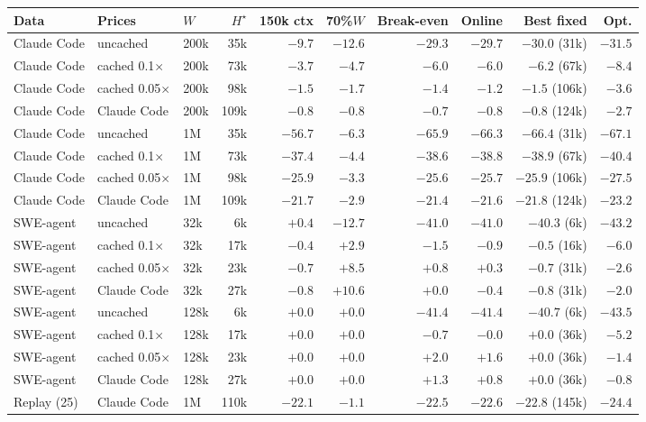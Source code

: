 \begin{tabular}{lllrrrrrrr}
\toprule
Data & Prices & $W$ & $H^\star$ & 150k ctx & 70\%$W$ & Break-even & Online & Best fixed & Opt.\\
\midrule
Claude Code & uncached & 200k & 35k & $-9.7$ & $-12.6$ & $-29.3$ & $-29.7$ & $-30.0$ (31k) & $-31.5$\\
Claude Code & cached 0.1$\times$ & 200k & 73k & $-3.7$ & $-4.7$ & $-6.0$ & $-6.0$ & $-6.2$ (67k) & $-8.4$\\
Claude Code & cached 0.05$\times$ & 200k & 98k & $-1.5$ & $-1.7$ & $-1.4$ & $-1.2$ & $-1.5$ (106k) & $-3.6$\\
Claude Code & Claude Code & 200k & 109k & $-0.8$ & $-0.8$ & $-0.7$ & $-0.8$ & $-0.8$ (124k) & $-2.7$\\
Claude Code & uncached & 1M & 35k & $-56.7$ & $-6.3$ & $-65.9$ & $-66.3$ & $-66.4$ (31k) & $-67.1$\\
Claude Code & cached 0.1$\times$ & 1M & 73k & $-37.4$ & $-4.4$ & $-38.6$ & $-38.8$ & $-38.9$ (67k) & $-40.4$\\
Claude Code & cached 0.05$\times$ & 1M & 98k & $-25.9$ & $-3.3$ & $-25.6$ & $-25.7$ & $-25.9$ (106k) & $-27.5$\\
Claude Code & Claude Code & 1M & 109k & $-21.7$ & $-2.9$ & $-21.4$ & $-21.6$ & $-21.8$ (124k) & $-23.2$\\
SWE-agent & uncached & 32k & 6k & $+0.4$ & $-12.7$ & $-41.0$ & $-41.0$ & $-40.3$ (6k) & $-43.2$\\
SWE-agent & cached 0.1$\times$ & 32k & 17k & $-0.4$ & $+2.9$ & $-1.5$ & $-0.9$ & $-0.5$ (16k) & $-6.0$\\
SWE-agent & cached 0.05$\times$ & 32k & 23k & $-0.7$ & $+8.5$ & $+0.8$ & $+0.3$ & $-0.7$ (31k) & $-2.6$\\
SWE-agent & Claude Code & 32k & 27k & $-0.8$ & $+10.6$ & $+0.0$ & $-0.4$ & $-0.8$ (31k) & $-2.0$\\
SWE-agent & uncached & 128k & 6k & $+0.0$ & $+0.0$ & $-41.4$ & $-41.4$ & $-40.7$ (6k) & $-43.5$\\
SWE-agent & cached 0.1$\times$ & 128k & 17k & $+0.0$ & $+0.0$ & $-0.7$ & $-0.0$ & $+0.0$ (36k) & $-5.2$\\
SWE-agent & cached 0.05$\times$ & 128k & 23k & $+0.0$ & $+0.0$ & $+2.0$ & $+1.6$ & $+0.0$ (36k) & $-1.4$\\
SWE-agent & Claude Code & 128k & 27k & $+0.0$ & $+0.0$ & $+1.3$ & $+0.8$ & $+0.0$ (36k) & $-0.8$\\
Replay (25) & Claude Code & 1M & 110k & $-22.1$ & $-1.1$ & $-22.5$ & $-22.6$ & $-22.8$ (145k) & $-24.4$\\
\bottomrule
\end{tabular}
